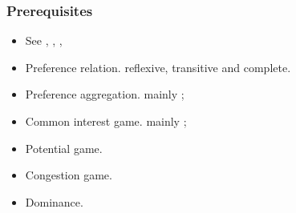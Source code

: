 \documentclass{article}
\begin{document}
\subsubsection{Prerequisites}
\begin{itemize}
 \item See \cite{holzman}, \cite{rosenthal}, \cite{rossi01}, \cite{voorneveld}
 \item Preference relation. reflexive, transitive and complete.
 \item Preference aggregation. mainly \cite{rossi01};
 \item Common interest game. mainly \cite{rossi01};
 \item Potential game.
 \item Congestion game.
 \item Dominance.
\end{itemize}
\end{document}
